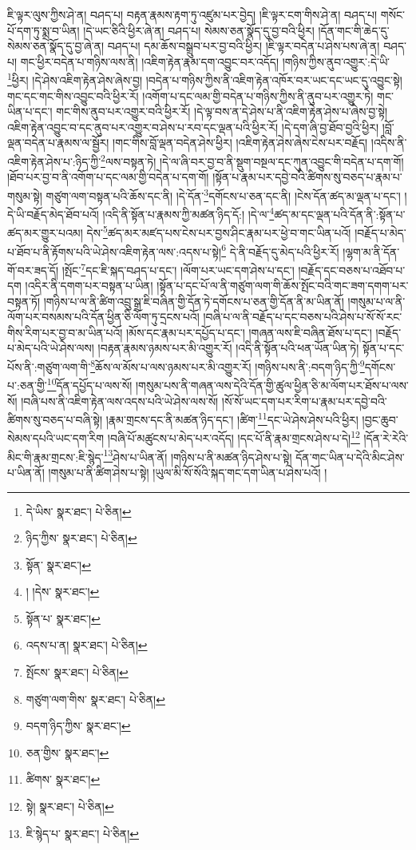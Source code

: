 ཇི་ལྟར་ལུས་ཀྱིས་ཤེ་ན། བཤད་པ། བརྟན་རྣམས་རྟག་ཏུ་འཛུམ་པར་བྱེད། །ཇི་ལྟར་ངག་གིས་ཤེ་ན། བཤད་པ། གསོང་པོ་དག་ཏུ་སྨྲ་བ་ཡིན། །དེ་ཡང་ཅིའི་ཕྱིར་ཞེ་ན། བཤད་པ། སེམས་ཅན་སྣོད་དུ་བྱ་བའི་ཕྱིར། །དོན་གང་གི་ཆེད་དུ་སེམས་ཅན་སྣོད་དུ་བྱ་ཞེ་ན། བཤད་པ། དམ་ཆོས་བསྒྲུབ་པར་བྱ་བའི་ཕྱིར། །ཇི་ལྟར་བདེན་པ་ཤེས་པས་ཞེ་ན། བཤད་པ། གང་ཕྱིར་བདེན་པ་གཉིས་ལས་ནི། །འཇིག་རྟེན་རྣམ་དག་འབྱུང་བར་འདོད། །གཉིས་ཀྱིས་ནུབ་འགྱུར་:དེ་ཡི་\footnote{དེ་ཡིས་  སྣར་ཐང་།  པེ་ཅིན། }ཕྱིར། །དེ་ཤེས་འཇིག་རྟེན་ཤེས་ཞེས་བྱ། །བདེན་པ་གཉིས་ཀྱིས་ནི་འཇིག་རྟེན་འཁོར་བར་ཡང་དང་ཡང་དུ་འབྱུང་སྟེ། གང་དང་གང་གིས་འབྱུང་བའི་ཕྱིར་རོ། །འགོག་པ་དང་ལམ་གྱི་བདེན་པ་གཉིས་ཀྱིས་ནི་ནུབ་པར་འགྱུར་ཏེ། གང་ཡིན་པ་དང་། གང་གིས་ནུབ་པར་འགྱུར་བའི་ཕྱིར་རོ། །དེ་ལྟ་བས་ན་དེ་ཤེས་པ་ནི་འཇིག་རྟེན་ཤེས་པ་ཞེས་བྱ་སྟེ། འཇིག་རྟེན་འབྱུང་བ་དང་ནུབ་པར་འགྱུར་བ་ཤེས་པ་རབ་དང་ལྡན་པའི་ཕྱིར་རོ། །དེ་དག་ཞི་བྱ་ཐོབ་བྱའི་ཕྱིར། །བློ་ལྡན་བདེན་པ་རྣམས་ལ་སྦྱོར། །གང་གིས་བློ་ལྡན་བདེན་ཤེས་ཕྱིར། །འཇིག་རྟེན་ཤེས་ཞེས་ངེས་པར་བརྗོད། །འདིས་ནི་འཇིག་རྟེན་ཤེས་པ་:ཉིད་ཀྱི་\footnote{ཉིད་ཀྱིས་  སྣར་ཐང་།  པེ་ཅིན། }ལས་བསྟན་ཏེ། །དེ་ལ་ཞི་བར་བྱ་བ་ནི་སྡུག་བསྔལ་དང་ཀུན་འབྱུང་གི་བདེན་པ་དག་གོ། །ཐོབ་པར་བྱ་བ་ནི་འགོག་པ་དང་ལམ་གྱི་བདེན་པ་དག་གོ། །སྟོན་པ་རྣམ་པར་དབྱེ་བའི་ཚིགས་སུ་བཅད་པ་རྣམ་པ་གསུམ་སྟེ། གཙུག་ལག་བསྟན་པའི་ཆོས་དང་ནི། །དེ་དོན་\footnote{སྟོན་  སྣར་ཐང་། }དགོངས་པ་ཅན་དང་ནི། །ངེས་དོན་ཚད་མ་ལྡན་པ་དང་། །དེ་ཡི་བརྗོད་མེད་ཐོབ་པའོ། །འདི་ནི་སྟོན་པ་རྣམས་ཀྱི་མཚན་ཉིད་དོ:། །དེ་ལ་\footnote{། །དེས་  སྣར་ཐང་། }ཚད་མ་དང་ལྡན་པའི་དོན་ནི་:སྟོན་པ་ཚད་མར་གྱུར་པའམ། དེས་\footnote{སྟོན་པ་  སྣར་ཐང་། }ཚད་མར་མཛད་པས་ངེས་པར་བྱས་ཤིང་རྣམ་པར་ཕྱེ་བ་གང་ཡིན་པའོ། །བརྗོད་པ་མེད་པ་ཐོབ་པ་ནི་རྟོགས་པའི་ཡེ་ཤེས་འཇིག་རྟེན་ལས་:འདས་པ་སྟེ།\footnote{འདས་པ་ན།  སྣར་ཐང་།  པེ་ཅིན། } དེ་ནི་བརྗོད་དུ་མེད་པའི་ཕྱིར་རོ། །ལྷག་མ་ནི་དོན་གོ་བར་ཟད་དོ། །སྤོང་\footnote{སྤོངས་  སྣར་ཐང་།  པེ་ཅིན། }དང་ཇི་སྐད་བཤད་པ་དང་། །ལོག་པར་ཡང་དག་ཤེས་པ་དང་། །བརྗོད་དང་བཅས་པ་འཐོབ་པ་དག །འདིར་ནི་དགག་པར་བསྟན་པ་ཡིན། །སྟོན་པ་དང་པོ་ལ་ནི་གཙུག་ལག་གི་ཆོས་སྤོང་བའི་གང་ཟག་དགག་པར་བསྟན་ཏོ། །གཉིས་པ་ལ་ནི་ཚིག་འབྲུ་སྒྲ་ཇི་བཞིན་གྱི་དོན་ཏེ་དགོངས་པ་ཅན་གྱི་དོན་ནི་མ་ཡིན་ནོ། །གསུམ་པ་ལ་ནི་ལོག་པར་བསམས་པའི་དོན་ཕྱིན་ཅི་ལོག་ཏུ་དྲངས་པའོ། །བཞི་པ་ལ་ནི་བརྗོད་པ་དང་བཅས་པའི་ཤེས་པ་སོ་སོ་རང་གིས་རིག་པར་བྱ་བ་མ་ཡིན་པའོ། །མོས་དང་རྣམ་པར་དཔྱོད་པ་དང་། །གཞན་ལས་ཇི་བཞིན་ཐོས་པ་དང་། །བརྗོད་པ་མེད་པའི་ཡེ་ཤེས་ལས། །བརྟན་རྣམས་ཉམས་པར་མི་འགྱུར་རོ། །འདི་ནི་སྟོན་པའི་ཕན་ཡོན་ཡིན་ཏེ། སྟོན་པ་དང་པོས་ནི་:གཙུག་ལག་གི་\footnote{གཙུག་ལག་གིས་  སྣར་ཐང་།  པེ་ཅིན། }ཆོས་ལ་མོས་པ་ལས་ཉམས་པར་མི་འགྱུར་རོ། །གཉིས་པས་ནི་:བདག་ཉིད་ཀྱི་\footnote{བདག་ཉིད་ཀྱིས་  སྣར་ཐང་། }དགོངས་པ་:ཅན་གྱི་\footnote{ཅན་གྱིས་  སྣར་ཐང་། }དོན་དཔྱོད་པ་ལས་སོ། །གསུམ་པས་ནི་གཞན་ལས་དེའི་དོན་གྱི་ཚུལ་ཕྱིན་ཅི་མ་ལོག་པར་ཐོས་པ་ལས་སོ། །བཞི་པས་ནི་འཇིག་རྟེན་ལས་འདས་པའི་ཡེ་ཤེས་ལས་སོ། །སོ་སོ་ཡང་དག་པར་རིག་པ་རྣམ་པར་དབྱེ་བའི་ཚིགས་སུ་བཅད་པ་བཞི་སྟེ། །རྣམ་གྲངས་དང་ནི་མཚན་ཉིད་དང་། །ཚིག་\footnote{ཚིགས་  སྣར་ཐང་། }དང་ཡེ་ཤེས་ཤེས་པའི་ཕྱིར། །བྱང་ཆུབ་སེམས་དཔའི་ཡང་དག་རིག །བཞི་པོ་མཚུངས་པ་མེད་པར་འདོད། །དང་པོ་ནི་རྣམ་གྲངས་ཤེས་པ་དེ།\footnote{སྟེ།  སྣར་ཐང་།  པེ་ཅིན། } །དོན་རེ་རེའི་མིང་གི་རྣམ་གྲངས་:ཇི་སྙེད་\footnote{ཇི་སྙེད་པ་  སྣར་ཐང་།  པེ་ཅིན། }ཤེས་པ་ཡིན་ནོ། །གཉིས་པ་ནི་མཚན་ཉིད་ཤེས་པ་སྟེ། དོན་གང་ཡིན་པ་དེའི་མིང་ཤེས་པ་ཡིན་ནོ། །གསུམ་པ་ནི་ཚིག་ཤེས་པ་སྟེ། །ཡུལ་མི་སོ་སོའི་སྐད་གང་དག་ཡིན་པ་ཤེས་པའོ། །
